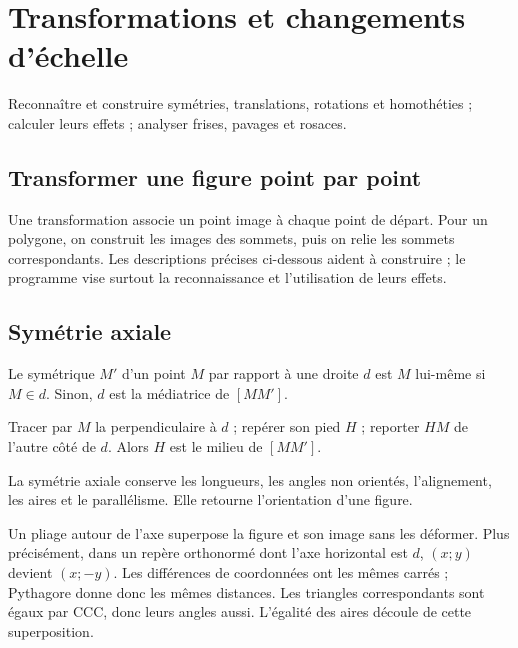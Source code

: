 \documentclass[../cours_3e.tex]{subfiles}
\begin{document}
\setcounter{chapter}{15}
\chapter{Transformations et changements d'échelle}
\label{ch:transformations}
\begin{objectif}
Reconnaître et construire symétries, translations, rotations et homothéties ; calculer leurs effets ; analyser frises, pavages et rosaces.
\end{objectif}
\section{Transformer une figure point par point}
Une transformation associe un point image à chaque point de départ. Pour un polygone, on construit les images des sommets, puis on relie les sommets correspondants. Les descriptions précises ci-dessous aident à construire ; le programme vise surtout la reconnaissance et l'utilisation de leurs effets.
\section{Symétrie axiale}
\begin{definition}
Le symétrique $M'$ d'un point $M$ par rapport à une droite $d$ est $M$ lui-même si $M\in d$. Sinon, $d$ est la médiatrice de $[MM']$.
\end{definition}
\begin{methode}
Tracer par $M$ la perpendiculaire à $d$ ; repérer son pied $H$ ; reporter $HM$ de l'autre côté de $d$. Alors $H$ est le milieu de $[MM']$.
\end{methode}
\begin{propriete}
La symétrie axiale conserve les longueurs, les angles non orientés, l'alignement, les aires et le parallélisme. Elle retourne l'orientation d'une figure.
\end{propriete}
\begin{justification}
Un pliage autour de l'axe superpose la figure et son image sans les déformer. Plus précisément, dans un repère orthonormé dont l'axe horizontal est $d$, $(x;y)$ devient $(x;-y)$. Les différences de coordonnées ont les mêmes carrés ; Pythagore donne donc les mêmes distances. Les triangles correspondants sont égaux par CCC, donc leurs angles aussi. L'égalité des aires découle de cette superposition.
\end{justification}
\end{document}
